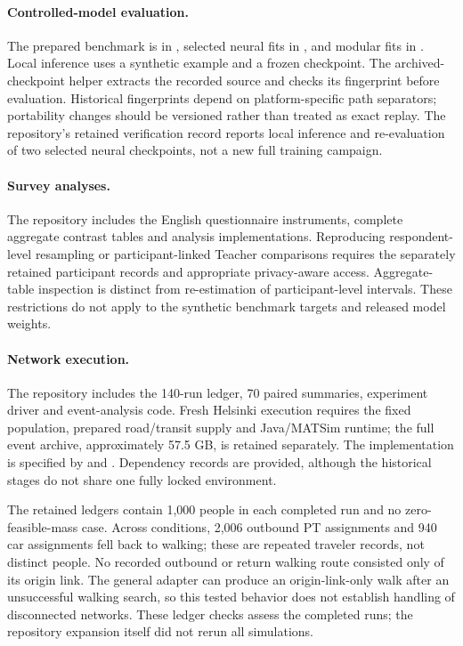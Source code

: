 \paragraph{Controlled-model evaluation.}
The prepared benchmark is in , selected neural fits in , and modular fits in . Local inference uses a synthetic example and a frozen checkpoint. The archived-checkpoint helper extracts the recorded source and checks its fingerprint before evaluation. Historical fingerprints depend on platform-specific path separators; portability changes should be versioned rather than treated as exact replay. The repository's retained verification record reports local inference and re-evaluation of two selected neural checkpoints, not a new full training campaign.

\paragraph{Survey analyses.}
The repository includes the English questionnaire instruments, complete aggregate contrast tables and analysis implementations. Reproducing respondent-level resampling or participant-linked Teacher comparisons requires the separately retained participant records and appropriate privacy-aware access. Aggregate-table inspection is distinct from re-estimation of participant-level intervals. These restrictions do not apply to the synthetic benchmark targets and released model weights.

\paragraph{Network execution.}
The repository includes the 140-run ledger, 70 paired summaries, experiment driver and event-analysis code. Fresh Helsinki execution requires the fixed population, prepared road/transit supply and Java/MATSim runtime; the full event archive, approximately 57.5 GB, is retained separately. The implementation is specified by  and . Dependency records are provided, although the historical stages do not share one fully locked environment.

The retained ledgers contain 1,000 people in each completed run and no zero-feasible-mass case. Across conditions, 2,006 outbound PT assignments and 940 car assignments fell back to walking; these are repeated traveler records, not distinct people. No recorded outbound or return walking route consisted only of its origin link. The general adapter can produce an origin-link-only walk after an unsuccessful walking search, so this tested behavior does not establish handling of disconnected networks. These ledger checks assess the completed runs; the repository expansion itself did not rerun all simulations.

